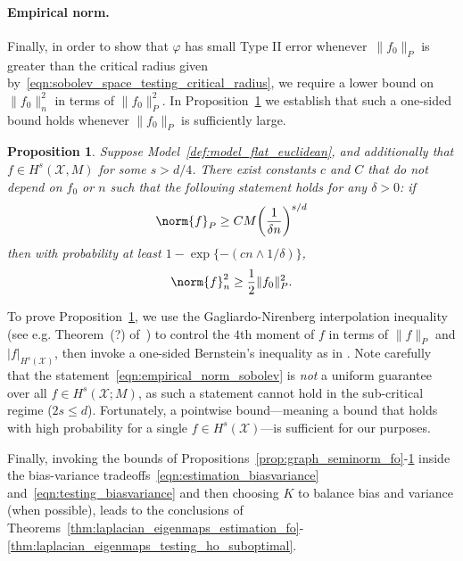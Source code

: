 \documentclass{article}
\newcommand{\1}{\mathbf{1}}
\newcommand{\Xset}{\mathcal{X}}
\newcommand{\mc}[1]{\mathcal{#1}}
\theoremstyle{alden}
\theoremstyle{aldenthm}
\newtheorem{proposition}{Proposition}
\theoremstyle{definition}
\theoremstyle{remark}
\begin{document}
\paragraph{Empirical norm.}
Finally, in order to show that $\varphi$ has small Type II error whenever~$\|f_0\|_P$ is greater than the critical radius given by~\eqref{eqn:sobolev_space_testing_critical_radius}, we require a lower bound on $\|f_0\|_n^2$ in terms of $\|f_0\|_P^2$. In Proposition~\ref{prop:empirical_norm_sobolev} we establish that such a one-sided bound holds whenever $\|f_0\|_P$ is sufficiently large.
\begin{proposition}
	\label{prop:empirical_norm_sobolev}
	Suppose Model~\ref{def:model_flat_euclidean}, and additionally that $f \in H^s(\Xset,M)$ for some $s > d/4$. There exist constants $c$ and $C$ that do not depend on $f_0$ or $n$ such that the following statement holds for any $\delta > 0$:  if
	\begin{equation}
	\label{eqn:empirical_norm_sobolev_1}
	\norm{f}_{P} \geq C M \biggl(\frac{1}{\delta n}\biggr)^{s/d}
	\end{equation}
	then with probability at least $1 - \exp\{-(cn \wedge 1/\delta)\}$,
	\begin{equation}
	\label{eqn:empirical_norm_sobolev}
	\norm{f}_n^2 \geq \frac{1}{2} \|f_0\|_P^2.
	\end{equation}
\end{proposition}
To prove Proposition~\ref{prop:empirical_norm_sobolev}, we use the Gagliardo-Nirenberg interpolation inequality (see e.g. Theorem~(?) of~\citep{evans10}) to control the $4$th moment of $f$ in terms of $\|f\|_P$ and $|f|_{H^s(\mc{X})}$, then invoke a one-sided Bernstein's inequality as in \cite[Section 14.2]{wainwright2019}. Note carefully that the statement~\eqref{eqn:empirical_norm_sobolev} is \emph{not} a uniform guarantee over all $f \in H^s(\mc{X};M)$, as such a statement cannot hold in the sub-critical regime ($2s \leq d$). Fortunately, a pointwise bound---meaning a bound that holds with high probability for a single $f \in H^s(\mc{X})$---is sufficient for our purposes.

Finally, invoking the bounds of Propositions~\ref{prop:graph_seminorm_fo}-\ref{prop:empirical_norm_sobolev} inside the bias-variance tradeoffs~\eqref{eqn:estimation_biasvariance} and~\eqref{eqn:testing_biasvariance} and then choosing $K$ to balance bias and variance (when possible), leads to the conclusions of Theorems~\ref{thm:laplacian_eigenmaps_estimation_fo}-\ref{thm:laplacian_eigenmaps_testing_ho_suboptimal}.
\end{document}
